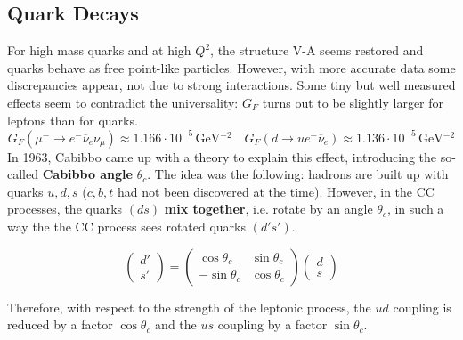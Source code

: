 \documentclass[10.75pt,a4paper,openright,bottom=2cm]{article}
\newcommand{\beginbox}[1]{\begin{tcolorbox}[width=\textwidth,colback={yellow!50},title={#1},colbacktitle={gray!50},coltitle=black]}
\renewcommand{\endbox}{\end{tcolorbox}\noindent}
\begin{document}
\subsection{Quark Decays}
For high mass quarks and at high $Q^2$, the structure V-A seems restored and quarks behave as free point-like particles. However, with more accurate data some discrepancies appear, not due to strong interactions. Some tiny but well measured effects seem to contradict the universality: $G_F$ turns out to be slightly larger for leptons than for quarks.
\[
G_F(\mu^-\to e^-\overline{\nu}_e\nu_\mu)\approx1.166\cdot10^{-5}\,\text{GeV$^{-2}$} \quad G_F(d\to ue^-\overline{\nu}_e)\approx1.136\cdot10^{-5}\,\text{GeV$^{-2}$}
\]
In 1963, Cabibbo came up with a theory to explain this effect, introducing the so-called \textbf{Cabibbo angle} $\theta_c$. The idea was the following: hadrons are built up with quarks $u,d,s$ ($c,b,t$ had not been discovered at the time). However, in the CC processes, the quarks $(ds)$ \textbf{mix together}, i.e. rotate by an angle $\theta_c$, in such a way the the CC process sees rotated quarks $(d's')$.
\beginbox{Cabibbo Theory}
\[
\begin{pmatrix}
    d'\\s'
\end{pmatrix}=\begin{pmatrix}
    \cos\theta_c & \sin\theta_c\\
    -\sin\theta_c & \cos\theta_c
\end{pmatrix}\begin{pmatrix}
    d\\s
\end{pmatrix}
\]
\endbox
Therefore, with respect to the strength of the leptonic process, the $ud$ coupling is reduced by a factor $\cos\theta_c$ and the $us$ coupling by a factor $\sin\theta_c$.\\
\begin{minipage}{0.3\textwidth}
\end{minipage}\hfill
\end{document}
